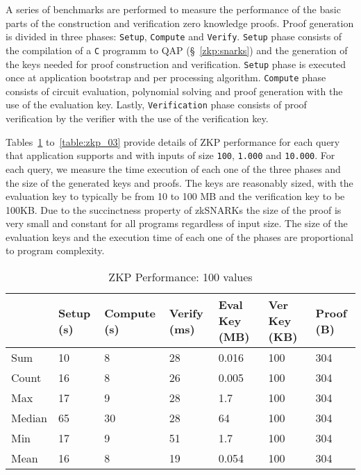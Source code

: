 A series of benchmarks are performed to measure the performance of the basic parts of the construction and verification zero knowledge proofs. Proof generation is divided in three phases: \verb|Setup|, \verb|Compute| and \verb|Verify|. \verb|Setup| phase consists of the compilation of a \verb|C| programm to QAP (§~\ref{zkp:snarks}) and the generation of the keys needed for proof construction and verification. \verb|Setup| phase is executed once at application bootstrap and per processing algorithm. \verb|Compute| phase consists of circuit evaluation, polynomial solving and proof generation with the use of the evaluation key. Lastly, \verb|Verification| phase consists of proof verification by the verifier with the use of the verification key.

Tables~\ref{table:zkp_01} to~\ref{table:zkp_03} provide details of ZKP performance for each query that application supports and with inputs of size \verb|100|, \verb|1.000| and \verb|10.000|. For each query, we measure the time execution of each one of the three phases and the size of the generated keys and proofs. The keys are reasonably sized, with the evaluation key to typically be from 10 to 100 MB and the verification key to be 100KB. Due to the succinctness property of zkSNARKs the size of the proof is very small and constant for all programs regardless of input size. The size of the evaluation keys and the execution time of each one of the phases are proportional to program complexity.

\begin{table}[!htb]
\small
\centering
\captionsetup{format=hang, justification=centering}
\caption{ZKP Performance: 100 values}
\begin{tabular}{|l|l|l|l|l|l|l|}
\hline
 & Setup (s) & Compute (s) & Verify (ms) & Eval Key (MB) & Ver Key (KB) & Proof (B)  \\ \hline
 Sum & 10 & 8 & 28 & 0.016 & 100 & 304 \\ \hline
 Count & 16 & 8 & 26 & 0.005 & 100 & 304 \\ \hline
 Max & 17 & 9 & 28 & 1.7 & 100 & 304 \\ \hline
 Median & 65 & 30 & 28 & 64 & 100 & 304 \\ \hline
 Min & 17 & 9 & 51 & 1.7 & 100 & 304 \\ \hline
 Mean & 16 & 8 & 19 & 0.054 & 100 & 304 \\ \hline
\end{tabular}
\label{table:zkp_01}
\end{table}

